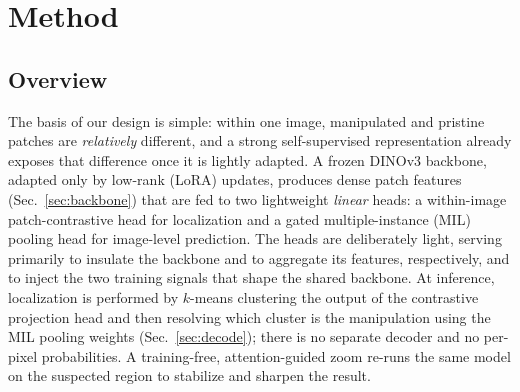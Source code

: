 
\section{Method}
\label{sec:method}

\subsection{Overview}
\label{sec:overview}
The basis of our design is simple: within one image, manipulated and
pristine patches are \emph{relatively} different, and a strong self-supervised
representation already exposes that difference once it is lightly adapted. A
frozen DINOv3 backbone, adapted only by low-rank (LoRA) updates, produces dense
patch features (Sec.~\ref{sec:backbone}) that are fed to two lightweight
\emph{linear} heads: a within-image patch-contrastive head for localization and
a gated multiple-instance (MIL) pooling head for image-level prediction. The
heads are deliberately light, serving primarily to insulate the backbone and to
aggregate its features, respectively, and to inject the two training signals
that shape the shared backbone. At inference, localization is performed by
$k$-means clustering the output of the contrastive projection head and then
resolving which cluster is the manipulation using the MIL pooling weights
(Sec.~\ref{sec:decode}); there is no separate decoder and no per-pixel
probabilities. A training-free, attention-guided zoom re-runs the same model on
the suspected region to stabilize and sharpen the result.

